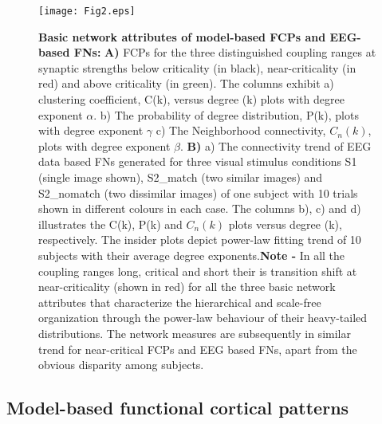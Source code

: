 \documentclass[preprintnumbers,amsmath,amssymb,onecolumn]{revtex4}
\begin{document}
\begin{figure}
\label{fig2}
\begin{center}
\texttt{[image: Fig2.eps]}
\caption{\textbf{Basic network attributes of model-based FCPs and EEG-based
FNs:} \textbf{A)} FCPs for the three distinguished coupling ranges
at synaptic strengths below criticality (in black), near-criticality
(in red) and above criticality (in green). The columns exhibit a)
clustering coefficient, C(k), versus degree (k) plots with degree
exponent $\alpha$. b) The probability of degree distribution, P(k),
plots with degree exponent $\gamma$ c) The Neighborhood connectivity,
$C_{n}(k)$, plots with degree exponent $\beta$.
\textbf{B)} a) The connectivity trend of EEG data based FNs generated
for three visual stimulus conditions S1 (single image shown), S2\_match
(two similar images) and S2\_nomatch (two dissimilar images) of one
subject with 10 trials shown in different colours in each case. The
columns b), c) and d) illustrates the C(k), P(k) and $C_{n}(k)$
plots versus degree (k), respectively. The insider plots depict power-law fitting trend of 10 subjects with their average degree exponents.\textbf{Note -} In all the coupling ranges long, critical and short their
is transition shift at near-criticality (shown in red) for all the
three basic network attributes that characterize the hierarchical
and scale-free organization through the power-law behaviour of their
heavy-tailed distributions. The network measures are subsequently
in similar trend for near-critical FCPs and EEG based FNs, apart from
the obvious disparity among subjects.} 
\end{center}
\end{figure}

\subsection{Model-based functional cortical patterns}
\end{document}
